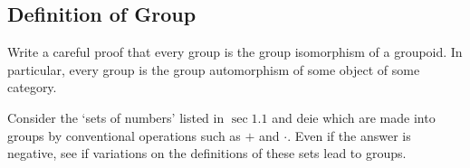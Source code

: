 \subsection{Definition of Group}

\begin{tcolorbox}[title=Problem 1, breakable] 
    Write a careful proof that every group is the group isomorphism
        of a groupoid. 
    In particular, every group is the group automorphism of some object 
        of some category.
\end{tcolorbox}

\begin{tcolorbox}[title=Problem 2, breakable] 
    Consider the `sets of numbers' listed in $\sec 1.1$ and deie 
    which are made into groups by conventional operations such as $+$ and $\cdot$.
    Even if the answer is negative, see if variations on the definitions of these sets 
    lead to groups.
\end{tcolorbox}